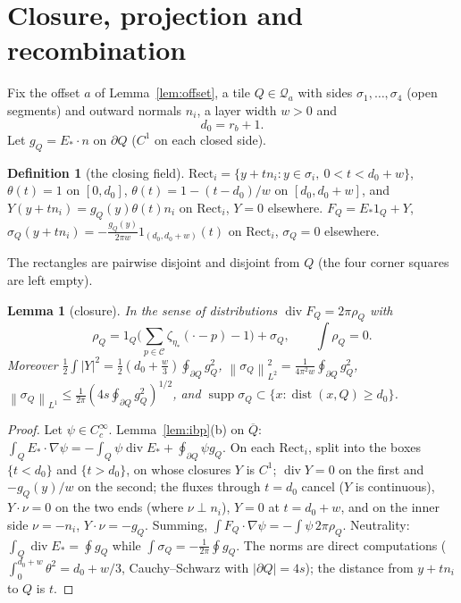 \documentclass[11pt,reqno]{amsart}
\numberwithin{equation}{section}
\theoremstyle{plain}
\newtheorem{lemma}[theorem]{Lemma}
\theoremstyle{definition}
\newtheorem{definition}[theorem]{Definition}
\newcommand{\dist}{\operatorname{dist}}
\newcommand{\supp}{\operatorname{supp}}
\newcommand{\dvg}{\operatorname{div}}
\newcommand{\norm}[1]{\left\|#1\right\|}
\begin{document}
\section{Closure, projection and recombination}\label{sec:closure}

Fix the offset $a$ of Lemma~\ref{lem:offset}, a tile $Q\in\mathcal Q_a$ with sides $\sigma_1,\dots,\sigma_4$ (open segments) and outward normals $n_i$, a layer width $w>0$ and
\[
d_0=r_b+1 .
\]
Let $g_Q=E_*\cdot n$ on $\partial Q$ ($C^1$ on each closed side).

\begin{definition}[the closing field]\label{def:Y}
$\mathrm{Rect}_i=\{y+tn_i:y\in\sigma_i,\ 0<t<d_0+w\}$, $\theta(t)=1$ on $[0,d_0]$, $\theta(t)=1-(t-d_0)/w$ on $[d_0,d_0+w]$, and $Y(y+tn_i)=g_Q(y)\theta(t)n_i$ on $\mathrm{Rect}_i$, $Y=0$ elsewhere.  $F_Q=E_*1_Q+Y$, $\sigma_Q(y+tn_i)=-\frac{g_Q(y)}{2\pi w}1_{(d_0,d_0+w)}(t)$ on $\mathrm{Rect}_i$, $\sigma_Q=0$ elsewhere.
\end{definition}
The rectangles are pairwise disjoint and disjoint from $Q$ (the four corner squares are left empty).

\begin{lemma}[closure]\label{lem:closure}
In the sense of distributions $\dvg F_Q=2\pi\rho_Q$ with
\[
\rho_Q=1_Q\Big(\sum_{p\in\mathcal C}\zeta_{\eta_*}(\cdot-p)-1\Big)+\sigma_Q,\qquad\int\rho_Q=0 .
\]
Moreover $\frac12\int|Y|^2=\frac12(d_0+\frac w3)\oint_{\partial Q}g_Q^2$, $\norm{\sigma_Q}_{L^2}^2=\frac1{4\pi^2w}\oint_{\partial Q}g_Q^2$, $\norm{\sigma_Q}_{L^1}\le\frac1{2\pi}(4s\oint_{\partial Q}g_Q^2)^{1/2}$, and $\supp\sigma_Q\subset\{x:\dist(x,Q)\ge d_0\}$.
\end{lemma}
\begin{proof}
Let $\psi\in C_c^\infty$.  Lemma~\ref{lem:ibp}(b) on $\overline Q$: $\int_QE_*\cdot\nabla\psi=-\int_Q\psi\dvg E_*+\oint_{\partial Q}\psi g_Q$.  On each $\mathrm{Rect}_i$, split into the boxes $\{t<d_0\}$ and $\{t>d_0\}$, on whose closures $Y$ is $C^1$; $\dvg Y=0$ on the first and $-g_Q(y)/w$ on the second; the fluxes through $t=d_0$ cancel ($Y$ is continuous), $Y\cdot\nu=0$ on the two ends (where $\nu\perp n_i$), $Y=0$ at $t=d_0+w$, and on the inner side $\nu=-n_i$, $Y\cdot\nu=-g_Q$.  Summing, $\int F_Q\cdot\nabla\psi=-\int\psi\,2\pi\rho_Q$.  Neutrality: $\int_Q\dvg E_*=\oint g_Q$ while $\int\sigma_Q=-\frac1{2\pi}\oint g_Q$.  The norms are direct computations ($\int_0^{d_0+w}\theta^2=d_0+w/3$, Cauchy--Schwarz with $|\partial Q|=4s$); the distance from $y+tn_i$ to $Q$ is $t$.
\end{proof}
\end{document}
